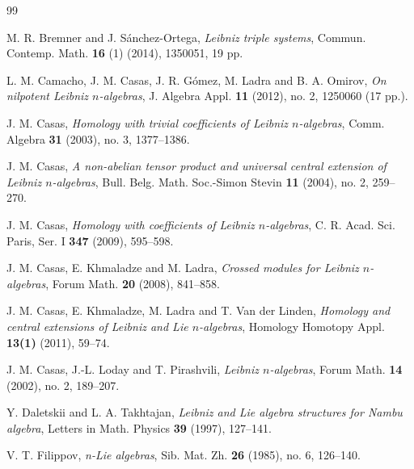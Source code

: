\documentclass[12pt, reqno]{amsart}
\begin{document}
\begin{thebibliography}{99}

 {M. R. Bremner and J. S\'anchez-Ortega}, {\it  Leibniz triple systems}, Commun. Contemp. Math.
  {\bf 16} (1) (2014),  1350051, 19 pp.
  
   {L. M. Camacho, J. M. Casas, J. R. G\'omez, M. Ladra and B. A. Omirov}, {\it On nilpotent Leibniz $n$-algebras},
  J. Algebra Appl. {\bf 11}  (2012), no. 2, 1250060 (17 pp.).
  
   {J. M. Casas}, {\it Homology with trivial coefficients of Leibniz $n$-algebras}, Comm.  Algebra {\bf 31}   (2003), no. 3, 1377--1386.

 {J. M. Casas}, {\it A non-abelian tensor product and universal central extension of Leibniz $n$-algebras},
 Bull. Belg. Math. Soc.-Simon Stevin {\bf 11}  (2004), no. 2, 259--270.



 {J. M. Casas}, {\it Homology with  coefficients of Leibniz $n$-algebras}, C. R. Acad. Sci. Paris, Ser. I  {\bf 347} (2009), 595--598.



 {J. M. Casas, E. Khmaladze and M. Ladra}, {\it  Crossed modules for Leibniz $n$-algebras},
Forum Math. {\bf 20}  (2008), 841--858.

 {J. M. Casas, E. Khmaladze, M. Ladra and T. Van der Linden}, {\it  Homology and central extensions of Leibniz and Lie $n$-algebras},
Homology Homotopy Appl. {\bf 13(1)} (2011), 59--74.



 {J. M. Casas, J.-L. Loday and T. Pirashvili}, {\it  Leibniz $n$-algebras}, Forum Math. {\bf 14} (2002), no. 2,  189--207.

 {Y. Daletskii and L. A. Takhtajan}, {\it  Leibniz and Lie algebra structures for Nambu algebra}, Letters in Math. Physics {\bf 39} (1997),  127--141.

  {V. T. Filippov}, {\it n-Lie algebras}, Sib. Mat. Zh. {\bf 26} (1985), no. 6, 126--140.


\end{thebibliography}
\end{document}
